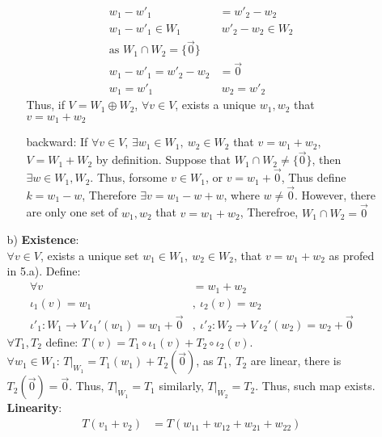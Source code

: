 \documentclass{article}
\begin{document}
\begin{itemize}
\begin{itemize}
\begin{itemize}
        \begin{align*}
            w_1-w'_1&=w'_2-w_2\\
            w_1-w'_1\in W_1\ &\  w'_2-w_2\in W_2\\
            \text{as }W_1\cap W_2 = \{\overrightarrow{0}\}\\
            w_1-w'_1=w'_2-w_2&=\overrightarrow{0}\\
            w_1=w'_1\ &\ w_2=w'_2
        \end{align*}
        Thus, if \(V=W_1\oplus W_2\), \(\forall v\in V\), exists a unique \(w_1,w_2\) that \(v = w_1+w_2\)
        \item [backward:] If \(\forall v \in V\), \(\exists w_1\in W_1,\ w_2\in W_2\) that \(v=w_1+w_2\), \(V = W_1+W_2\) by definition. Suppose that \(W_1\cap W_2 \neq \{\overrightarrow{0}\}\), 
        then \(\exists w\in W_1,W_2\). Thus, forsome \(v\in W_1\), or \(v = w_1+\overrightarrow{0}\),  Thus define \(k = w_1-w\), Therefore \(\exists v = w_1-w+w\), where \(w\neq \overrightarrow{0}\). However, there are only one set of \(w_1,w_2\) that \(v=w_1+w_2\), Therefroe, \(W_1\cap W_2 = \overrightarrow{0}\)
    \end{itemize}
    \item [b)] \textbf{Existence}:\\
                \(\forall v\in V\), exists a unique set \(w_1\in W_1,\ w_2\in W_2\), that \(v = w_1+w_2\) as profed in 5.a).
                Define:
                \begin{align*}
                    \forall v &= w_1+w_2\\
                    \iota_1(v) = w_1&,\ \iota_2(v) = w_2\\
                    \iota'_1:W_1\rightarrow V \ \iota_1' (w_1) = w_1+\overrightarrow{0}&, \ \iota'_2:W_2\rightarrow V \ \iota_2' (w_2) = w_2+\overrightarrow{0}
                \end{align*}
                \(\forall T_1,T_2\) define: \(T(v) = T_1\circ \iota_1(v)+T_2\circ \iota_2(v)\).\\
                \(\forall w_1 \in W_1\): \(T|_{W_1} = T_1(w_1)+T_2(\overrightarrow{0})\), as \(T_1,\ T_2\) are linear, there is \(T_2(\overrightarrow{0})=\overrightarrow{0}\). Thus, \(T|_{W_1} = T_1\) similarly, \(T|_{W_2}=T_2\). Thus, such map exists.\\
                \textbf{Linearity}:\\
                \begin{align*}
                    T(v_1+v_2) &= T(w_{11}+w_{12}+w_{21}+w_{22})\\

\end{align*}
\end{itemize}
\end{itemize}
\end{document}
